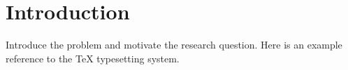\section{ Introduction }
Introduce the problem and motivate the research question. Here is an example reference to the TeX typesetting system. \autocite{knuth1984}
